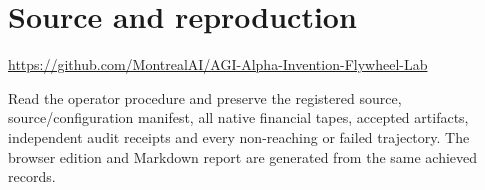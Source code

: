 \documentclass[10pt,letterpaper]{article}
\begin{document}
\section{Source and reproduction}
\url{https://github.com/MontrealAI/AGI-Alpha-Invention-Flywheel-Lab}
\par Read the operator procedure and preserve the registered source, source/configuration manifest, all native financial tapes, accepted artifacts, independent audit receipts and every non-reaching or failed trajectory. The browser edition and Markdown report are generated from the same achieved records.
\end{document}
